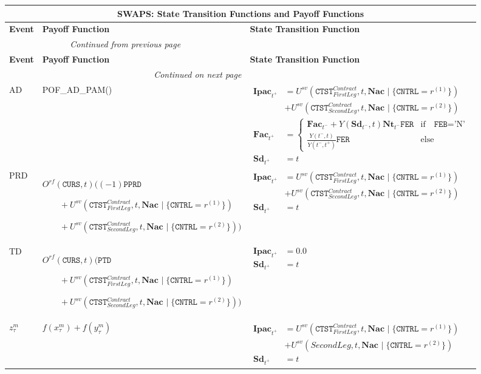\documentclass[9pt,oneside]{amsart}
\newenvironment{functions}[1]{
	\hfill %
    	\begin{longtable}{| p{0.05\textwidth} | p{0.42\textwidth} |  p{0.48\textwidth} |}
	\multicolumn{3}{c}{\textbf{#1: State Transition Functions and Payoff Functions}}\\
	\hline
	\textbf{Event} & \textbf{Payoff Function} & \textbf{State Transition Function}\\
	\hline
	\endfirsthead
	\multicolumn{2}{c}{\textit{Continued from previous page}} \\
	\hline
	\textbf{Event} & \textbf{Payoff Function} & \textbf{State Transition Function}\\
	\hline
	\endhead
	\hline \multicolumn{2}{r}{\textit{Continued on next page}} \\
	\endfoot
	\endlastfoot
}{%
	\hline
    	\end{longtable}
}
\newcommand{\svar}[2]{\textbf{#1}_{#2}}
\newcommand{\attr}[1]{\texttt{#1}}
\newcommand{\pof}[2]{POF\_#1\_#2()}
\newcommand{\yfr}[2]{Y(#1,#2)}
\newcommand{\obs}[3]{O^{#1}(#2,#3)}
\newcommand{\cldsv}[4]{U^{sv}(#1,#2,\svar{#3}{} \mid\{#4\})}
\newcommand{\fev}[1]{f(#1)}
\begin{document}
\begin{functions}{SWAPS}
	AD & \pof{AD}{PAM} & {$\begin{aligned}
				\svar{Ipac}{t^+} &= \cldsv{\attr{CTST}_{FirstLeg}^{Contract}}{t}{Nac}{\attr{CNTRL}=r^{(1)}} \\
						&+ \cldsv{\attr{CTST}_{SecondLeg}^{Contract}}{t}{Nac}{\attr{CNTRL}=r^{(2)}} \\
				\svar{Fac}{t^+} &= \begin{cases} \svar{Fac}{t^-} + \yfr{\svar{Sd}{t^-}}{t}\svar{Nt}{t^-}\attr{FER} & \text{if} \quad \attr{FEB}=\text{'N'} \\
					\frac{\yfr{t^-}{t}}{\yfr{t^-}{t^+}}\attr{FER} & \text{else} \end{cases} \\
				\svar{Sd}{t^+} &= t \end{aligned}$} \\
	\hline
	PRD & $\obs{rf}{\attr{CURS}}{t} ( (-1)\attr{PPRD}$ \par
				 $\qquad + \cldsv{\attr{CTST}_{FirstLeg}^{Contract}}{t}{Nac}{\attr{CNTRL}=r^{(1)}}$ \par
				 $\qquad + \cldsv{\attr{CTST}_{SecondLeg}^{Contract}}{t}{Nac}{\attr{CNTRL}=r^{(2)}})$
		& {$\begin{aligned}
				\svar{Ipac}{t^+} &= \cldsv{\attr{CTST}_{FirstLeg}^{Contract}}{t}{Nac}{\attr{CNTRL}=r^{(1)}} \\
						&+ \cldsv{\attr{CTST}_{SecondLeg}^{Contract}}{t}{Nac}{\attr{CNTRL}=r^{(2)}} \\
				\svar{Sd}{t^+} &= t \end{aligned}$} \\
	\hline
	TD & $\obs{rf}{\attr{CURS}}{t} (\attr{PTD}$ \par
				 $\qquad + \cldsv{\attr{CTST}_{FirstLeg}^{Contract}}{t}{Nac}{\attr{CNTRL}=r^{(1)}}$ \par
				 $\qquad + \cldsv{\attr{CTST}_{SecondLeg}^{Contract}}{t}{Nac}{\attr{CNTRL}=r^{(2)}})$
		& {$\begin{aligned}
				\svar{Ipac}{t^+} &= 0.0 \\
				\svar{Sd}{t^+} &= t \end{aligned}$} \\
	\hline
	$z_\tau^m$ & $\fev{x_\tau^m}+\fev{y_\tau^m}$
		& {$\begin{aligned}
				\svar{Ipac}{t^+} &= \cldsv{\attr{CTST}_{FirstLeg}^{Contract}}{t}{Nac}{\attr{CNTRL}=r^{(1)}} \\						&+ \cldsv{SecondLeg}{t}{Nac}{\attr{CNTRL}=r^{(2)}} \\
				\svar{Sd}{t^+} &= t \end{aligned}$} \\
\end{functions}
\end{document}
